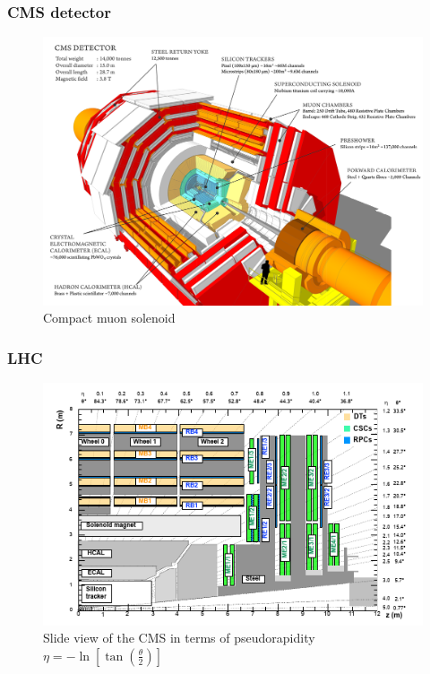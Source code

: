 \documentclass[11pt]{beamer}
\begin{document}
\begin{frame}
\frametitle{CMS detector}
\begin{center}
	\begin{figure}
		\includegraphics[scale=0.08]{figures/cms.png}
		\caption{Compact muon solenoid}
	\end{figure}
\end{center}
\end{frame}


\begin{frame}
\frametitle{LHC}
\begin{figure}[ht!]
	\centering
	\includegraphics[scale=0.6]{figures/csc.png}
	\caption*{Slide view of the CMS in terms of pseudorapidity $\eta=-\ln\left[\tan\left(\frac{\theta}{2}\right)\right]$}
\end{figure}
\end{frame}
\end{document}
